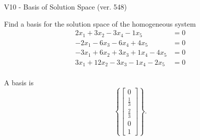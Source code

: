 \begin{exercise}
  \begin{exerciseTitle}V10 - Basis of Solution Space (ver. 548)\end{exerciseTitle}
  \begin{exerciseStatement}
    Find a basis for the solution space of the homogeneous system 
\begin{align*}
 2 x_ 1 + 3 x_ 2 -3 x_ 4 -1 x_ 5 &= 0  \\ 
  -2 x_ 1 -6 x_ 3 -6 x_ 4 + 4 x_ 5 &= 0  \\ 
  -3 x_ 1 + 6 x_ 2 + 3 x_ 3 + 1 x_ 4 -4 x_ 5 &= 0  \\ 
  3 x_ 1 + 12 x_ 2 -3 x_ 3 -1 x_ 4 -2 x_ 5 &= 0  \\ 
 \end{align*}


 
  \end{exerciseStatement}

  \begin{exerciseAnswer}
   A basis is   
\[\left\{\left[\begin{array}{c}
0 \\
\frac{1}{3} \\
\frac{2}{3} \\
0 \\
1
\end{array}\right]\right\}.\]

  


  \end{exerciseAnswer}
\end{exercise}
